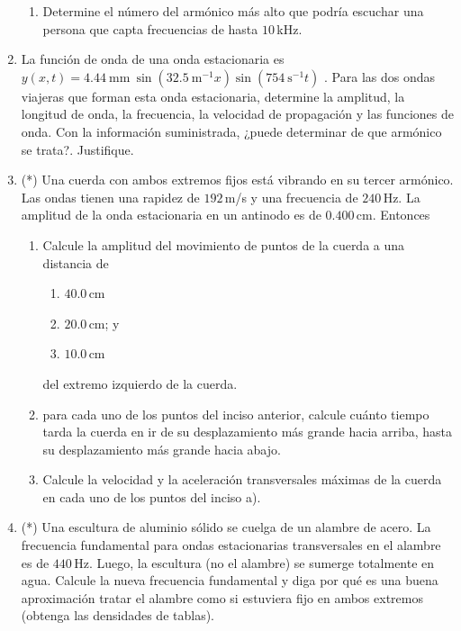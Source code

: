 \documentclass[a4paper,12pt]{article}
\begin{document}
\begin{enumerate}
\begin{enumerate}
			\item Determine el número del armónico más alto que podría escuchar
				una persona que capta frecuencias de hasta $10$\,kHz.
		\end{enumerate}
	\item La función de onda de una onda estacionaria es $y(x,t) =
		4.44\mathrm{\ mm\ } \sin \left ( 32.5 \mathrm{\ m}^{-1} x \right ) \sin
		\left (754 \mathrm{\ s}^{-1} t \right )$ . Para las dos ondas viajeras que
		forman esta onda estacionaria, determine la amplitud, la longitud de
		onda, la frecuencia, la velocidad de propagación y las funciones de
		onda. Con la información suministrada, ¿puede determinar de que
		armónico se trata?. Justifique.
	\item (*) Una cuerda con ambos extremos fijos está vibrando en su tercer
		armónico. Las ondas tienen una rapidez de $192$\,m/s y una frecuencia
		de $240$\,Hz. La amplitud de la onda estacionaria en un antinodo es de
		$0.400$\,cm. Entonces
		\begin{enumerate}
			\item Calcule la amplitud del movimiento de puntos de la cuerda a
				una distancia de
				\begin{enumerate}
					\item $40.0$\,cm
					\item $20.0$\,cm; y 
					\item $10.0$\,cm
				\end{enumerate}
				del extremo izquierdo de la cuerda. 
			\item para cada uno de los puntos del inciso anterior, calcule
				cuánto tiempo tarda la cuerda en ir de su desplazamiento más
				grande hacia arriba, hasta su desplazamiento más grande hacia
				abajo.
			\item Calcule la velocidad y la aceleración transversales máximas
				de la cuerda en cada uno de los puntos del inciso a).
		\end{enumerate}
	\item (*) Una escultura de aluminio sólido se cuelga de un alambre de
		acero. La frecuencia fundamental para ondas estacionarias transversales
		en el alambre es de $440$\,Hz. Luego, la escultura (no el alambre) se
		sumerge totalmente en agua. Calcule la nueva frecuencia fundamental y
		diga por qué es una buena aproximación tratar el alambre como si
		estuviera fijo en ambos extremos (obtenga las densidades de tablas).
\end{enumerate}
\end{document}
